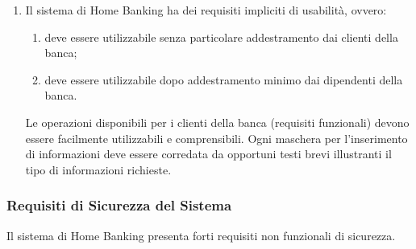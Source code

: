 \begin{enumerate}
	\item \label{itm:utente:non-funzionali:usabilita} Il sistema di Home Banking ha dei requisiti impliciti di usabilit\`a, ovvero:
	\begin{enumerate}
		\item \label{itm:utente:non-funzionali:usabilita:clienti} deve essere utilizzabile senza particolare addestramento dai clienti della banca;
		\item \label{itm:utente:non-funzionali:usabilita:management} deve essere utilizzabile dopo addestramento minimo dai dipendenti della banca.
	\end{enumerate}
	Le operazioni disponibili per i clienti della banca (requisiti funzionali) devono essere facilmente utilizzabili e comprensibili.
	Ogni maschera per l'inserimento di informazioni deve essere corredata da opportuni testi brevi illustranti il tipo di informazioni richieste.
\end{enumerate}

\subsubsection{Requisiti di Sicurezza del Sistema}
\label{sec:utente:non-funzionali:sicurezza}

Il sistema di Home Banking presenta forti requisiti non funzionali di sicurezza.

